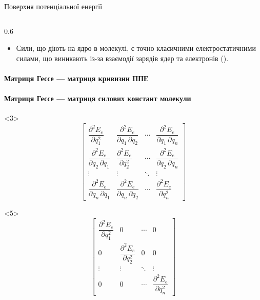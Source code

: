 \documentclass[]{beamer}
\begin{document}
\begin{frame}[t]{Поверхня потенціальної енергії}{}
\begin{columns}
\begin{column}{0.6\linewidth}
\begin{onlyenv}
\begin{itemize}
					\item Сили, що діють на ядро в молекулі, є точно класичними електростатичними силами, що виникають із-за взаємодії зарядів ядер та електронів ().
				\end{itemize}
			\end{onlyenv}
			\framesubtitle<3>{Матриця Гессе --- матриця кривизни ППЕ}
			\framesubtitle<5>{Матриця Гессе --- матриця силових констант молекули}
			\begin{onlyenv}<3>
				\begin{equation*}\label{}
					\begin{bmatrix}
						\dfrac{\partial^2 E_e}{\partial q_1^2}             & \dfrac{\partial^2 E_e}{\partial q_1\,\partial q_2} & \cdots & \dfrac{\partial^2 E_e}{\partial q_1\,\partial q_n} \\
						\dfrac{\partial^2 E_e}{\partial q_2\,\partial q_1} & \dfrac{\partial^2 E_e}{\partial q_2^2}             & \cdots & \dfrac{\partial^2 E_e}{\partial q_2\,\partial q_n} \\
						\vdots                                             & \vdots                                             & \ddots & \vdots                                             \\
						\dfrac{\partial^2 E_e}{\partial q_n\,\partial q_1} & \dfrac{\partial^2 E_e}{\partial q_n\,\partial q_2} & \cdots & \dfrac{\partial^2 E_e}{\partial q_n^2}
					\end{bmatrix}
				\end{equation*}
			\end{onlyenv}
			\begin{onlyenv}<5>
				\begin{equation*}\label{}
					\begin{bmatrix}
						\dfrac{\partial^2 E_e}{\partial q_1^2} & 0                                      & \cdots & 0                                      \\
						0                                      & \dfrac{\partial^2 E_e}{\partial q_2^2} & 0      & 0                                      \\
						\vdots                                 & \vdots                                 & \ddots & \vdots                                 \\
						0                                      & 0                                      & \cdots & \dfrac{\partial^2 E_e}{\partial q_n^2}
					\end{bmatrix}
				\end{equation*}

\end{onlyenv}
\end{column}
\end{columns}
\end{frame}
\end{document}
